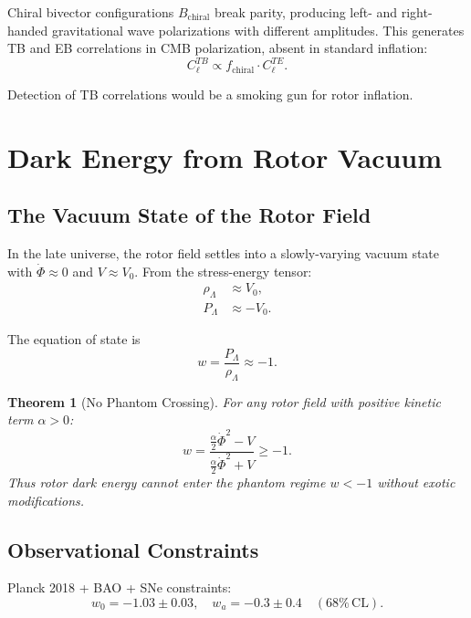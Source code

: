 \documentclass[11pt,a4paper]{article}
\numberwithin{equation}{section}
\theoremstyle{plain}
\newtheorem{theorem}{Theorem}[section]
\theoremstyle{definition}
\theoremstyle{remark}
\begin{document}
Chiral bivector configurations $B_{\mathrm{chiral}}$ break parity, producing left- and right-handed gravitational wave polarizations with different amplitudes. This generates TB and EB correlations in CMB polarization, absent in standard inflation:
\begin{equation}
C_\ell^{TB} \propto f_{\mathrm{chiral}} \cdot C_\ell^{TE}.
\end{equation}

Detection of TB correlations would be a smoking gun for rotor inflation.

\section{Dark Energy from Rotor Vacuum}
\label{sec:dark-energy}

\subsection{The Vacuum State of the Rotor Field}

In the late universe, the rotor field settles into a slowly-varying vacuum state with $\dot{\Phi} \approx 0$ and $V \approx V_0$. From the stress-energy tensor:
\begin{align}
\rho_{\Lambda} &\approx V_0,\\
P_{\Lambda} &\approx -V_0.
\end{align}

The equation of state is
\begin{equation}
w = \frac{P_{\Lambda}}{\rho_{\Lambda}} \approx -1.
\label{eq:de-eos}
\end{equation}

\begin{theorem}[No Phantom Crossing]
For any rotor field with positive kinetic term $\alpha > 0$:
\begin{equation}
w = \frac{\frac{\alpha}{2}\dot{\Phi}^2 - V}{\frac{\alpha}{2}\dot{\Phi}^2 + V} \geq -1.
\end{equation}
Thus rotor dark energy cannot enter the phantom regime $w < -1$ without exotic modifications.
\end{theorem}

\subsection{Observational Constraints}

Planck 2018 + BAO + SNe constraints:
\begin{equation}
w_0 = -1.03 \pm 0.03, \quad w_a = -0.3 \pm 0.4 \quad (68\%\,\mathrm{CL}).
\end{equation}
\end{document}
